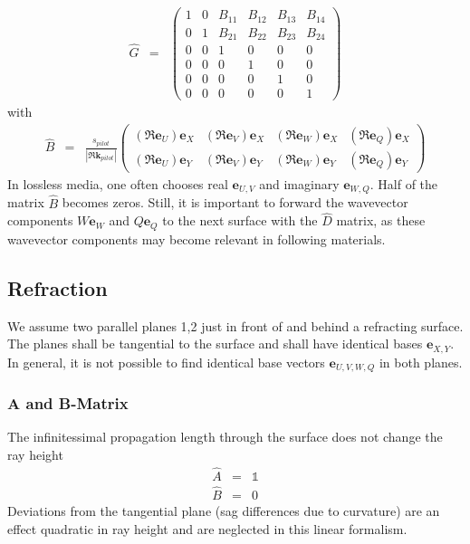 \documentclass[12pt,a4paper,twoside,openright,BCOR10mm,headsepline,titlepage,abstracton,chapterprefix,final]{scrreprt}
\newcommand\Vector[1]{{\mathbf{#1}}}
\newcommand\wavenumber{k}
\newcommand\Wavevector{\Vector{\wavenumber}}
\newcommand\unittensor{\mathds{1}}
\begin{document}
\begin{eqnarray}
 \hat{G} &=&
 \begin{pmatrix}
  1 & 0 & B_{11} & B_{12} & B_{13} & B_{14} \\
  0 & 1 & B_{21} & B_{22} & B_{23} & B_{24} \\
  0 & 0 & 1 & 0 & 0 & 0 \\
  0 & 0 & 0 & 1 & 0 & 0 \\
  0 & 0 & 0 & 0 & 1 & 0 \\
  0 & 0 & 0 & 0 & 0 & 1  
 \end{pmatrix}
 \label{eq:xyuv_propagation_homogeneous}
\end{eqnarray}
with\begin{eqnarray}
 \hat{B} &=&
 \frac{ s_{pilot} }{| \Re \Wavevector_{pilot} |}
 \begin{pmatrix}
  (\Re \Vector{e}_U) \Vector{e}_X & (\Re \Vector{e}_V) \Vector{e}_X & (\Re \Vector{e}_W) \Vector{e}_X & (\Re \Vector{e}_Q) \Vector{e}_X \\
  (\Re \Vector{e}_U) \Vector{e}_Y & (\Re \Vector{e}_V) \Vector{e}_Y & (\Re \Vector{e}_W) \Vector{e}_Y & (\Re \Vector{e}_Q) \Vector{e}_Y
 \end{pmatrix}
\end{eqnarray}
In lossless media, one often chooses real $\Vector{e}_{U,V}$ and imaginary $\Vector{e}_{W,Q}$.
Half of the matrix $\hat{B}$ becomes zeros.
Still, it is important to forward the wavevector components 
$W \Vector{e}_W$ and $Q \Vector{e}_Q$
to the next surface with the $\hat{D}$ matrix, 
as these wavevector components may become relevant in following materials.

\subsection{Refraction}
We assume two parallel planes 1,2 just in front of and behind a refracting surface.
The planes shall be tangential to the surface 
and shall have identical bases $\Vector{e}_{X,Y}$.
In general, it is not possible to find identical base vectors $\Vector{e}_{U,V,W,Q}$ in both planes.

\subsubsection{A and B-Matrix}
The infinitessimal propagation length through the surface does not change the ray height
\begin{eqnarray}
 \hat{A} &=& \unittensor \\
 \hat{B} &=& 0
\end{eqnarray}
Deviations from the tangential plane (sag differences due to curvature) 
are an effect quadratic in ray height and are neglected in this linear formalism.
\end{document}
